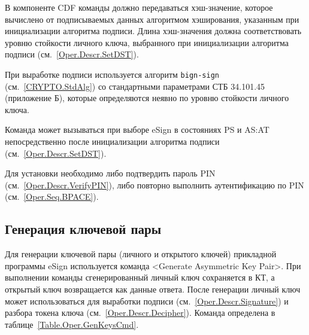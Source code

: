 В компоненте CDF команды должно передаваться хэш-значение, которое вычислено
от подписываемых данных алгоритмом хэширования, указанным 
при инициализации алгоритма подписи. Длина хэш-значения должна 
соответствовать уровню стойкости личного ключа, выбранного при инициализации 
алгоритма подписи (см.~\ref{Oper.Descr.SetDST}).

При выработке подписи используется алгоритм \texttt{bign-sign}
(см.~\ref{CRYPTO.StdAlg}) со стандартными параметрами СТБ 34.101.45 
(приложение Б), которые определяются неявно по уровню стойкости личного ключа.

Команда может вызываться при выборе eSign в состояниях 
PS и AS:AT непосредственно после инициализации алгоритма подписи
(см.~\ref{Oper.Descr.SetDST}).

%
Для установки  необходимо либо подтвердить пароль PIN 
(см.~\ref{Oper.Descr.VerifyPIN}), либо повторно выполнить аутентификацию по PIN 
(см.~\ref{Oper.Seq.BPACE}). 

\subsection{Генерация ключевой пары}\label{Oper.Descr.GenKeys}

Для генерации ключевой пары (личного и открытого ключей) прикладной 
программы eSign используется команда <Generate Asymmetric Key Pair>. При 
выполнении команды сгенерированный личный ключ сохраняется в КТ,
а открытый ключ возвращается как данные ответа.
После генерации личный ключ может использоваться 
для выработки подписи (см.~\ref{Oper.Descr.Signature}) и
разбора токена ключа (см.~\ref{Oper.Descr.Decipher}).
Команда определена в таблице~\ref{Table.Oper.GenKeysCmd}.

